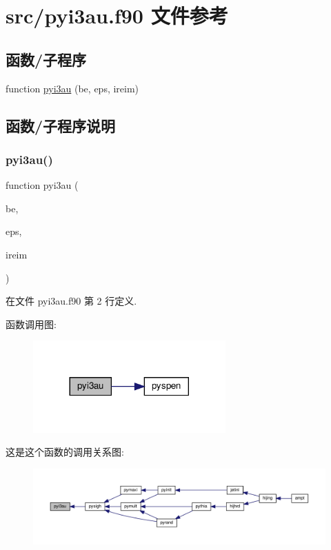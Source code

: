 \hypertarget{pyi3au_8f90}{}\section{src/pyi3au.f90 文件参考}
\label{pyi3au_8f90}
\subsection*{函数/子程序}
\begin{DoxyCompactItemize}
\item 
function \mbox{\hyperlink{pyi3au_8f90_a71c77e7db696552a810aa354366599f0}{pyi3au}} (be, eps, ireim)
\end{DoxyCompactItemize}


\subsection{函数/子程序说明}
\mbox{\label{pyi3au_8f90_a71c77e7db696552a810aa354366599f0}} 
\subsubsection{\texorpdfstring{pyi3au()}{pyi3au()}}
{\footnotesize\ttfamily function pyi3au (\begin{DoxyParamCaption}\item[{}]{be,  }\item[{}]{eps,  }\item[{}]{ireim }\end{DoxyParamCaption})}



在文件 pyi3au.\+f90 第 2 行定义.

函数调用图\+:
\nopagebreak
\begin{figure}[H]
\begin{center}
\leavevmode
\includegraphics[width=209pt]{pyi3au_8f90_a71c77e7db696552a810aa354366599f0_cgraph}
\end{center}
\end{figure}
这是这个函数的调用关系图\+:
\nopagebreak
\begin{figure}[H]
\begin{center}
\leavevmode
\includegraphics[width=350pt]{pyi3au_8f90_a71c77e7db696552a810aa354366599f0_icgraph}
\end{center}
\end{figure}
